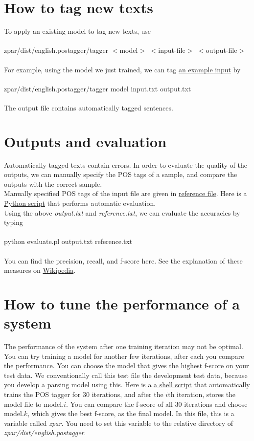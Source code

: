 \documentclass[12pt]{article}
\begin{document}
\begin{CJK}{GBK}{song}
\section{How to tag new texts}
To apply an existing model to tag new texts, use
\\
\\
\hspace{3cm} zpar/dist/english.postagger/tagger $<$model$>$ $<$input-file$>$ $<$output-file$>$
\\
\\
For example, using the model we just trained, we can tag \href{eng_pos_files/input.txt}{an example input} by
\\
\\
\hspace{3cm} zpar/dist/english.postagger/tagger model input.txt output.txt
\\
\\
The output file contains automatically tagged sentences.
\section{Outputs and evaluation}
Automatically tagged texts contain errors. In order to evaluate the quality of the outputs, we can manually specify the POS tags of a sample, and compare the outputs with the correct sample.
\\
Manually specified POS tags of the input file are given in \href{eng_tag_files/reference.txt}{reference file}. Here is a \href{eng_tag_files/evaluate.py}{Python script} that performs automatic evaluation.
\\
Using the above \textit{output.txt} and \textit{reference.txt}, we can evaluate the accuracies by typing
\\
\\
\hspace{3cm} python evaluate.pl output.txt reference.txt
\\
\\
You can find the precision, recall, and f-score here. See the explanation of these measures on \href{http://en.wikipedia.org/wiki/Precision_and_recall}{Wikipedia}.
\section{How to tune the performance of a system}
The performance of the system after one training iteration may not be optimal. You can try training a model for another few iterations, after each you compare the performance. You can choose the model that gives the highest f-score on your test data. We conventionally call this test file the development test data, because you develop a parsing model using this. Here is a \href{eng_tag_files/test.sh}{a shell script} that automatically trains the POS tagger for 30 iterations, and after the $i$th iteration, stores the model file to model.$i$. You can compare the f-score of all 30 iterations and choose model.$k$, which gives the best f-score, as the final model. In this file, this is a variable called \textit{zpar}. You need to set this variable to the relative directory of \textit{zpar/dist/english.postagger}.
\end{CJK}
\end{document}
